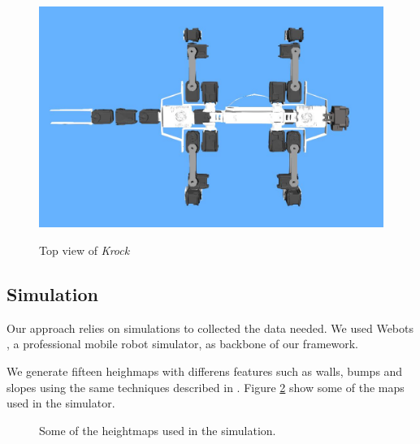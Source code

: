 \documentclass[../document.tex]{subfiles}
\begin{document}
\begin{figure}[H]
    \centering
    \includegraphics[width=\linewidth]{../img/krock-top.jpg}
    \label{fig:krock-top}
    \caption{Top view of \emph{Krock}}
\end{figure}

\subsection{Simulation}
Our approach relies on simulations to collected the data needed. We used Webots \cite{webots}, a professional 
mobile robot simulator, as backbone of our framework. 

We generate fifteen heighmaps with differens features 
such as walls, bumps and slopes using the same techniques described in \cite{omar@traversability}. Figure \ref{fig:heightmaps}
show some of the maps used in the simulator. 
\begin{figure}[H]
\label{fig:heightmaps}
\caption{Some of the heightmaps used in the simulation.}
\end{figure}
\end{document}
